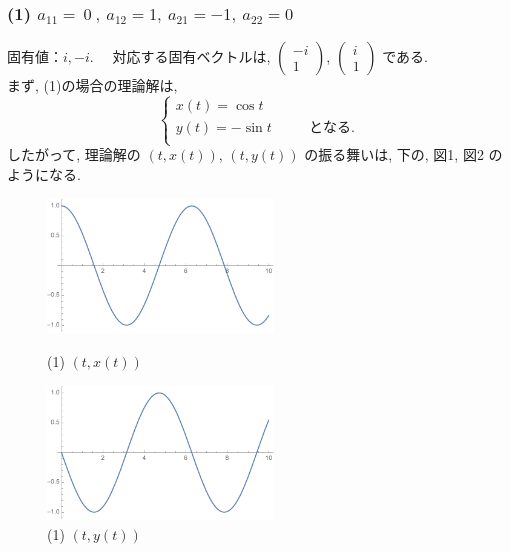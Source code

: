 \documentclass[11pt]{jsarticle}
\begin{document}
\subsubsection{(1) $a_{11} = \ 0\ , \ a_{12} = 1, \ a_{21} = -1, \ a_{22} = 0$}
固有値：$i, -i$. \ \ 対応する固有ベクトルは, $\begin{pmatrix} -i \\ 1 \end{pmatrix}$, $\begin{pmatrix} i \\ 1 \end{pmatrix}$ である. \\
まず, (1)の場合の理論解は, 
\[\left\{ 
\begin{array}{l}
\displaystyle x(t) = \cos t \\
\displaystyle y(t) = -\sin t \ \ \ \ \ \ \ \ \ \ \ \ となる. \\
\end{array}
\right. \]
したがって, 理論解の $(t, x(t))$, $(t, y(t))$ の振る舞いは, 下の, 図1, 図2 のようになる. 

\begin{figure}[htbp]
\centering
\begin{minipage}{0.45\columnwidth}
\centering
\includegraphics[width=6cm]{images/1_x.pdf}
\caption{(1) $(t, x(t))$}
\end{minipage}
%
\begin{minipage}{0.45\columnwidth}
\centering
\includegraphics[width=6cm]{images/1_y.pdf}
\caption{(1) $(t, y(t))$}
\end{minipage}
\end{figure}
\end{document}
